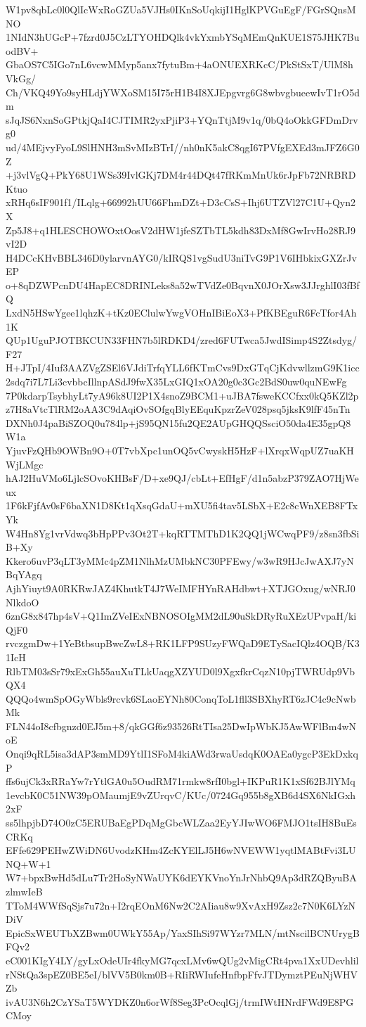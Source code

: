 W1pv8qbLc0l0QlIcWxRoGZUa5VJHs0IKnSoUqkijI1HglKPVGuEgF/FGrSQnsMNO
1NIdN3hUGcP+7fzrd0J5CzLTYOHDQlk4vkYxmbYSqMEmQnKUE1S75JHK7BuodBV+
GbaOS7C5IGo7nL6vcwMMyp5anx7fytuBm+4aONUEXRKcC/PkStSxT/UlM8hVkGg/
Ch/VKQ49Yo9syHLdjYWXoSM15I75rH1B4I8XJEpgvrg6G8wbvgbueewIvT1rO5dm
sJqJS6NxnSoGPtkjQaI4CJTIMR2yxPjiP3+YQnTtjM9v1q/0bQ4oOkkGFDmDrvg0
ud/4MEjvyFyoL9SlHNH3mSvMIzBTrI//nh0nK5akC8qgI67PVfgEXEd3mJFZ6G0Z
+j3vlVgQ+PkY68U1WSs39IvlGKj7DM4r44DQt47fRKmMnUk6rJpFb72NRBRDKtuo
xRHq6sIF901f1/ILqlg+66992hUU66FhmDZt+D3cCsS+Ihj6UTZVl27C1U+Qyn2X
Zp5J8+q1HLESCHOWOxtOosV2dHW1jfeSZTbTL5kdh83DxMf8GwIrvHo28RJ9vI2D
H4DCcKHvBBL346D0ylarvnAYG0/kIRQS1vgSudU3niTvG9P1V6IHbkixGXZrJvEP
o+8qDZWPcnDU4HapEC8DRINLeks8a52wTVdZe0BqvnX0JOrXsw3JJrghlI03fBfQ
LxdN5HSwYgee1lqhzK+tKz0EClulwYwgVOHnIBiEoX3+PfKBEguR6FcTfor4Ah1K
QUp1UguPJOTBKCUN33FHN7b5lRDKD4/zred6FUTwca5JwdISimp4S2Ztsdyg/F27
H+JTpI/4Iuf3AAZVgZSEl6VJdiTrfqYLL6fKTmCvs9DxGTqCjKdvwllzmG9K1icc
2sdq7i7L7Li3cvbbcIllnpASdJ9fwX35LxGIQ1xOA20g0c3Gc2BdS0uw0quNEwFg
7P0kdarpTsybhyLt7yA96k8UI2P1X4snoZ9BCM1+uJBA7fsweKCCfxx0kQ5KZl2p
z7H8aVtcTlRM2oAA3C9dAqiOvSOfgqBlyEEquKpzrZeV028psq5jksK9lfF45nTn
DXNh0J4paBiSZOQ0u784lp+jS95QN15fu2QE2AUpGHQQSsciO50da4E35gpQ8W1a
YjuvFzQHb9OWBn9O+0T7vbXpc1unOQ5vCwyskH5HzF+lXrqxWqpUZ7uaKHWjLMgc
hAJ2HuVMo6LjlcSOvoKHBsF/D+xe9QJ/cbLt+EfHgF/d1n5abzP379ZAO7HjWeux
1F6kFjfAv0sF6baXN1D8Kt1qXsqGdaU+mXU5fi4tav5LSbX+E2c8cWnXEB8FTxYk
W4Hn8Yg1vrVdwq3bHpPPv3Ot2T+kqRTTMThD1K2QQ1jWCwqPF9/z8sn3fbSiB+Xy
Kkero6uvP3qLT3yMMc4pZM1NlhMzUMbkNC30PFEwy/w3wR9HJcJwAXJ7yNBqYAgq
AjhYiuyt9A0RKRwJAZ4KhutkT4J7WeIMFHYnRAHdbwt+XTJGOxug/wNRJ0NlkdoO
6znG8x847hp4sV+Q1ImZVeIExNBNOSOIgMM2dL90uSkDRyRuXEzUPvpaH/kiQjF0
rvczgmDw+1YeBtbsupBwcZwL8+RK1LFP9SUzyFWQaD9ETySacIQlz4OQB/K31IcH
RlbTM03sSr79xExGh55auXuTLkUaqgXZYUD0l9XgxfkrCqzN10pjTWRUdp9VbQX4
QQQo4wmSpOGyWbls9rcvk6SLaoEYNh80ConqToL1fll3SBXhyRT6zJC4c9cNwbMk
FLN44oI8cfbgnzd0EJ5m+8/qkGGf6z93526RtTIsa25DwIpWbKJ5AwWFlBm4wNoE
Onqi9qRL5isa3dAP3smMD9YtlI1SFoM4kiAWd3rwaUsdqK0OAEa0ygcP3EkDxkqP
ffs6ujCk3xRRaYw7rYtlGA0u5OudRM71rmkw8rfI0bgl+IKPuR1K1xSf62BJlYMq
1evcbK0C51NW39pOMaumjE9vZUrqvC/KUc/0724Gq955b8gXB6d4SX6NkIGxh2xF
ss5lhpjbD74O0zC5ERUBaEgPDqMgGbcWLZaa2EyYJIwWO6FMJO1tsIH8BuEsCRKq
EFfe629PEHwZWiDN6UvodzKHm4ZcKYElLJ5H6wNVEWW1yqtlMABtFvi3LUNQ+W+1
W7+bpxBwHd5dLu7Tr2HoSyNWaUYK6dEYKVnoYnJrNhbQ9Ap3dRZQByuBAzlmwIeB
TToM4WWfSqSjs7u72n+I2rqEOnM6Nw2C2AIiau8w9XvAxH9Zsz2c7N0K6LYzNDiV
EpicSxWEUTbXZBwm0UWkY55Ap/YaxSIhSi97WYzr7MLN/mtNscilBCNUrygBFQv2
eC001KIgY4LY/gyLxOdeUIr4fkyMG7qcxLMv6wQUg2vMigCRt4pva1XxUDevhlil
rNStQa3spEZ0BE5eI/blVV5B0km0B+RIiRWIufeHnfbpFfvJTDymztPEuNjWHVZb
ivAU3N6h2CzYSaT5WYDKZ0n6orWf8Seg3PcOcqlGj/trmIWtHNrdFWd9E8PGCMoy
